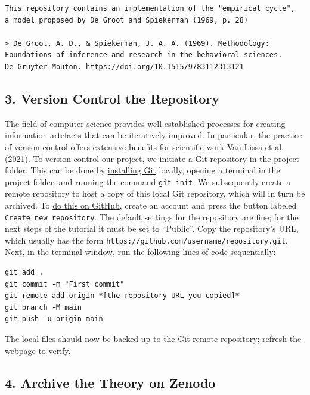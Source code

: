 \documentclass[
  man,floatsintext]{apa6}
\begin{document}
\begin{verbatim}
This repository contains an implementation of the "empirical cycle",
a model proposed by De Groot and Spiekerman (1969, p. 28)

> De Groot, A. D., & Spiekerman, J. A. A. (1969). Methodology:
Foundations of inference and research in the behavioral sciences.
De Gruyter Mouton. https://doi.org/10.1515/9783112313121
\end{verbatim}

\subsection{3. Version Control the Repository}\label{version-control-the-repository}

The field of computer science provides well-established processes for creating information artefacts that can be iteratively improved.
In particular, the practice of version control offers extensive benefits for scientific work Van Lissa et al. (2021).
To version control our project, we initiate a Git repository in the project folder.
This can be done by \href{https://git-scm.com/book/en/v2/Getting-Started-Installing-Git}{installing Git} locally,
opening a terminal in the project folder,
and running the command \texttt{git\ init}.
We subsequently create a remote repository to host a copy of this local Git repository, which will in turn be archived.
To \href{https://github.blog/developer-skills/github/beginners-guide-to-github-repositories-how-to-create-your-first-repo/}{do this on GitHub}, create an account and press the button labeled \texttt{Create\ new\ repository}.
The default settings for the repository are fine;
for the next steps of the tutorial it must be set to ``Public''.
Copy the repository's URL, which usually has the form \texttt{https://github.com/username/repository.git}.
Next, in the terminal window, run the following lines of code sequentially:

\begin{verbatim}
git add .
git commit -m "First commit"
git remote add origin *[the repository URL you copied]*
git branch -M main
git push -u origin main
\end{verbatim}

The local files should now be backed up to the Git remote repository;
refresh the webpage to verify.

\subsection{4. Archive the Theory on Zenodo}\label{archive-the-theory-on-zenodo}
\end{document}

